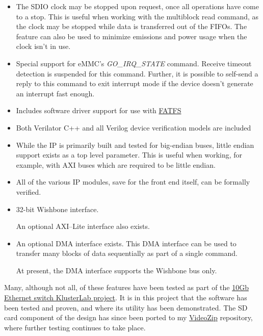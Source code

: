 \documentclass{gqtekspec}
\newcommand{\zhref}[2]{\href{#1}{\textcolor{dkblue}{#2}}}
\begin{document}
\begin{itemize}
\item The SDIO clock may be stopped upon request, once all operations have
	come to a stop.  This is useful when working with the multiblock read
	command, as the clock may be stopped while data is transferred out
	of the FIFOs.  The feature can also be used to minimize emissions
	and power usage when the clock isn't in use.

\item Special support for eMMC's {\em GO\_IRQ\_STATE} command.  Receive timeout
	detection is suspended for this command.  Further, it is possible to
	self-send a reply to this command to exit interrupt mode if the device
	doesn't generate an interrupt fast enough.

\item Includes software driver support for use with 
	\zhref{http://elm-chan.org/fsw/ff/}{FATFS}

\item Both Verilator C++ and all Verilog device verification models are
	included

\item While the IP is primarily built and tested for big-endian buses,
	little endian support exists as a top level parameter.  This is useful
	when working, for example, with AXI buses which are required to be
	little endian.

\item All of the various IP modules, save for the front end itself, can be
	formally verified.

\item 32-bit Wishbone interface.

	An optional AXI--Lite interface also exists.

\item An optional DMA interface exists.  This DMA interface can be used to
	transfer many blocks of data sequentially as part of a single command.

	At present, the DMA interface supports the Wishbone bus only.

\end{itemize}

Many, although not all, of these features have been tested as part of the
\zhref{https://github.com/ZipCPU/eth10g}{10Gb Ethernet switch KlusterLab
project}.  It is in this project that the software has been tested and proven,
and where its utility has been demonstrated.  The SD card component of the
design has since been ported to my
\zhref{https://github.com/ZipCPU/videozip}{VideoZip} repository, where further
testing continues to take place.
\end{document}
